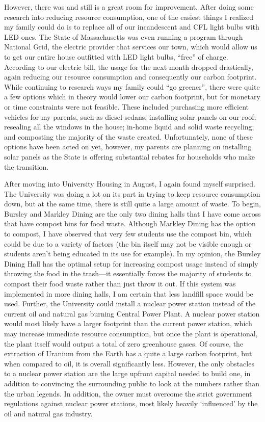 \documentclass[11pt]{article}
\begin{document}
However, there was and still is a great room for improvement. After doing some research into reducing resource consumption, one of the easiest things I realized my family could do is to replace all of our incandescent and CFL light bulbs with LED ones. The State of Massachusetts was even running a program through National Grid, the electric provider that services our town, which would allow us to get our entire house outfitted with LED light bulbs, ``free'' of charge. According to our electric bill, the usage for the next month dropped drastically, again reducing our resource consumption and consequently our carbon footprint. While continuing to research ways my family could ``go greener'', there were quite a few options which in theory would lower our carbon footprint, but for monetary or time constraints were not feasible. These included purchasing more efficient vehicles for my parents, such as diesel sedans; installing solar panels on our roof; resealing all the windows in the house; in-home liquid and solid waste recycling; and composting the majority of the waste created. Unfortunately, none of these options have been acted on yet, however, my parents are planning on installing solar panels as the State is offering substantial rebates for households who make the transition.

After moving into University Housing in August, I again found myself surprised. The University was doing a lot on its part in trying to keep resource consumption down, but at the same time, there is still quite a large amount of waste. To begin, Bursley and Markley Dining are the only two dining halls that I have come across that have compost bins for food waste. Although Markley Dining has the option to compost, I have observed that very few students use the compost bin, which could be due to a variety of factors (the bin itself may not be visible enough or students aren't being educated in its use for example). In my opinion, the Bursley Dining Hall has the optimal setup for increasing compost usage instead of simply throwing the food in the trash---it essentially forces the majority of students to compost their food waste rather than just throw it out. If this system was implemented in more dining halls, I am certain that less landfill space would be used. Further, the University could install a nuclear power station instead of the current oil and natural gas burning Central Power Plant. A nuclear power station would most likely have a larger footprint than the current power station, which may increase immediate resource consumption, but once the plant is operational, the plant itself would output a total of zero greenhouse gases. Of course, the extraction of Uranium from the Earth has a quite a large carbon footprint, but when compared to oil, it is overall significantly less. However, the only obstacles to a nuclear power station are the large upfront capital needed to build one, in addition to convincing the surrounding public to look at the numbers rather than the urban legends. In addition, the owner must overcome the strict government regulations against nuclear power stations, most likely heavily `influenced' by the oil and natural gas industry.
\end{document}
